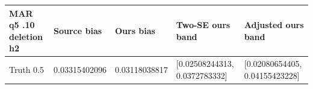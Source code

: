 \begin{longtable}{p{1.2in}p{.8in}p{.8in}p{1.4in}p{1.4in}}
\toprule
MAR q5 .10 deletion h2 & Source bias & Ours bias & Two-SE ours band & Adjusted ours band\\\midrule\endhead
Truth 0.5 & 0.03315402096 & 0.03118038817 & [0.02508244313, 0.0372783332] & [0.02080654405, 0.04155423228]\\
\bottomrule\end{longtable}
